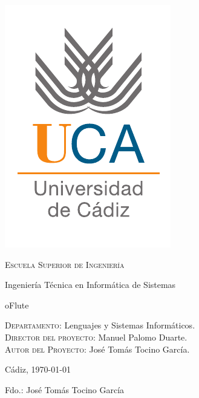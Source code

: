 {
  \thispagestyle{empty}
  \centering
  \includegraphics[width=.2\textwidth]{logo_uca}

  \bigskip
  \bigskip
  \bigskip
  
  \begin{changemargin}{3em}{3em}

    \begin{center}
      {\Huge \textsc{\nohyphens{Escuela Superior de Ingeniería}}}
      
      \bigskip
      \bigskip
      
      {\huge \nohyphens{Ingeniería Técnica en Informática de Sistemas}}
      
      \bigskip
      \bigskip
      \bigskip
      \bigskip
      
      {\LARGE \nohyphens{oFlute}}
      
      \bigskip
      \bigskip
      \bigskip
      \bigskip
      
    \end{center}
  \end{changemargin}
  \begin{changemargin}{3em}{1em}
  \begin{flushleft}
    \Large

    \textsc{Departamento}: \nohyphens{Lenguajes y Sistemas Informáticos.} \\
    \textsc{Director del proyecto}: \nohyphens{Manuel Palomo Duarte.} \\
    \textsc{Autor del Proyecto}: \nohyphens{José Tomás Tocino García}. \\
  \end{flushleft}

  \end{changemargin}  

  \bigskip
  \bigskip
  \bigskip
  
  \begin{flushright}
    \large
    Cádiz, \today
    
    Fdo.: José Tomás Tocino García
    
  \end{flushright}

}
